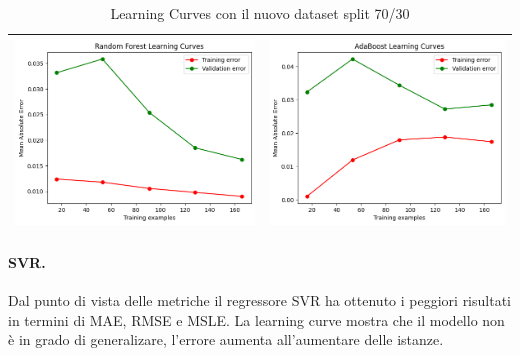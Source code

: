 \begin{table}[H]
\begin{tabularx}{\textwidth}{|X|X|}
        \includegraphics[width=\linewidth, trim=0 0 0 0]{images/RandomForestRegressor_lc70.png} &
        \includegraphics[width=\linewidth, trim=0 0 0 0]{images/AdaBoostRegressor_lc70.png} \\
        \hline
    \end{tabularx}
    \caption{Learning Curves con il nuovo dataset split 70/30}
    \label{tab:emissions_info}
\end{table}

\paragraph{\textbf{SVR}.}
Dal punto di vista delle metriche il regressore SVR ha ottenuto i peggiori risultati in termini di MAE, RMSE e MSLE. La learning curve mostra che il modello non è in grado di generalizare, l'errore aumenta all'aumentare delle istanze.

